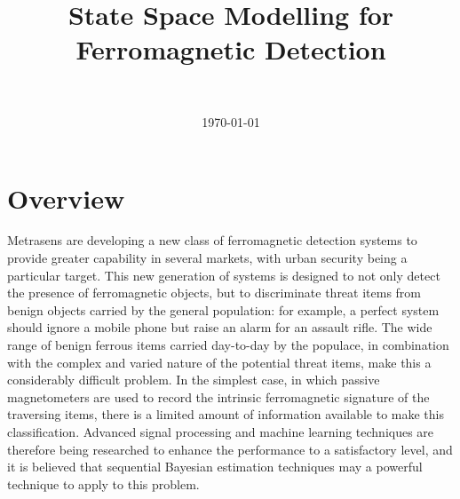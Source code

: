 \documentclass[10pt, a4paper, twocolumn]{article} %
\title{State Space Modelling for Ferromagnetic Detection} %
\author{
	\authorstyle{Richard Hodgskin-Brown} %
	\newline\newline %
	\metdisclaimer{Commercial in Confidence $|$ \copyright \ Metrasens Ltd. 2022}\\ %
}
\date{\today} %
\begin{document}
\maketitle %

\thispagestyle{firstpage} %





\section{Overview}

Metrasens are developing a new class of ferromagnetic detection systems to provide greater capability in several markets, with urban security being a particular target. This new generation of systems is designed to not only detect the presence of ferromagnetic objects, but to discriminate threat items from benign objects carried by the general population: for example, a perfect system should ignore a mobile phone but raise an alarm for an assault rifle. The wide range of benign ferrous items carried day-to-day by the populace, in combination with the complex and varied nature of the potential threat items, make this a considerably difficult problem. In the simplest case, in which passive magnetometers are used to record the intrinsic ferromagnetic signature of the traversing items, there is a limited amount of information available to make this classification. Advanced signal processing and machine learning techniques are therefore being researched to enhance the performance to a satisfactory level, and it is believed that sequential Bayesian estimation techniques may a powerful technique to apply to this problem.
\end{document}
